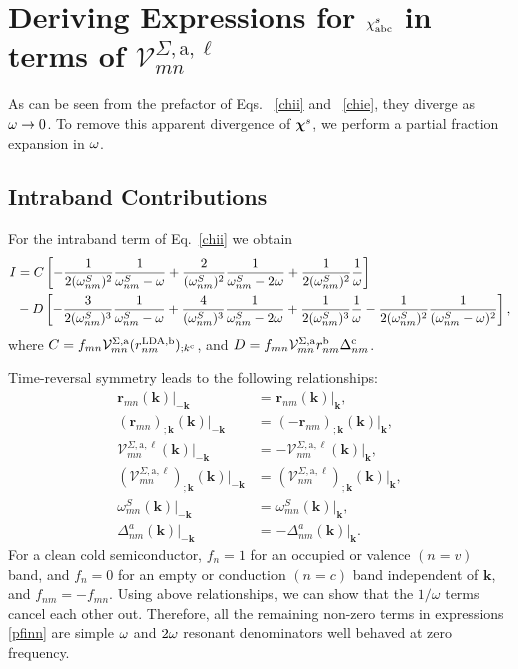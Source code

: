 \section{Deriving Expressions for \texorpdfstring{$\chi^s_{\mathrm{a}\mathrm{b}\mathrm{c}}$}{Xabc}
in terms of \texorpdfstring{$\mathcal{V}^{\Sigma,\text{a},\ell}_{mn}$}{Vmn}}
\label{appv}

As can be seen from the prefactor of Eqs. ~\eqref{chii} and
~\eqref{chie}, they 
diverge as $\omega\to 0$. To remove this apparent 
divergence of $\boldsymbol{\chi}^s$, we perform
a partial fraction  expansion in $\omega$.

\subsection{Intraband Contributions}

For the intraband term of Eq.~\eqref{chii}
we obtain
\begin{align}\label{pfinn} 
I&= 
C
\left[
-\frac{1}{2(\omega^S_{nm})^2}\frac{1}{\omega^S_{nm}-\omega}
+\frac{2}{(\omega^S_{nm})^2}\frac{1}{\omega^S_{nm}-2\omega}
+\frac{1}{2(\omega^S_{nm})^2}\frac{1}{\omega}
\right]
\nonumber\\
&-D
\left[
-\frac{3}{2(\omega^S_{nm})^3}\frac{1}{\omega^S_{nm}-\omega}
+\frac{4}{(\omega^S_{nm})^3}\frac{1}{\omega^S_{nm}-2\omega}
+\frac{1}{2(\omega^S_{nm})^3}\frac{1}{\omega}
-\frac{1}{2(\omega^S_{nm})^2}\frac{1}{(\omega^S_{nm}-\omega)^2}
\right]
,
\end{align} 
where 
$C=f_{mn}{\cal V}^{\Sigma,\mathrm{a}}_{mn}(r^{\mathrm{LDA},\mathrm{b}}_{nm})_{;k^{\mathrm{c}}}$, 
and
$D=f_{mn}{\cal V}^{\Sigma,\mathrm{a}}_{mn}r^{\mathrm{b}}_{nm}\Delta^{\mathrm{c}}_{nm}$.

Time-reversal symmetry leads to the following relationships:
\begin{align}\label{time_reversal}
    \mathbf{r}_{mn}(\mathbf{k})|_{-\mathbf{k}}
&=  \mathbf{r}_{nm}(\mathbf{k})|_{\mathbf{k}},\nonumber\\
    (\mathbf{r}_{mn})_{;\mathbf{k}}(\mathbf{k})|_{-\mathbf{k}}
&=  (-\mathbf{r}_{nm})_{;\mathbf{k}}(\mathbf{k})|_{\mathbf{k}},\nonumber\\
    \mathcal{V}^{\Sigma,\text{a},\ell}_{mn}(\mathbf{k})|_{-\mathbf{k}}
&=  -\mathbf{\mathcal{V}}_{nm}^{\Sigma,\text{a},\ell}(\mathbf{k})|_{\mathbf{k}},
    \nonumber\\
    (\mathcal{V}^{\Sigma,\text{a},\ell}_{mn})_{;\mathbf{k}}
    (\mathbf{k})|_{-\mathbf{k}}
&=  (\mathbf{\mathcal{V}}_{nm}^{\Sigma,\text{a},\ell})_{;\mathbf{k}}
    (\mathbf{k})|_{\mathbf{k}},\\
    \omega_{mn}^{S}(\mathbf{k})|_{-\mathbf{k}}
&=  \omega_{mn}^{S}(\mathbf{k})|_{\mathbf{k}},\nonumber\\
    \Delta^a_{nm}(\mathbf{k})|_{-\mathbf{k}}
&=  -\Delta^a_{nm}(\mathbf{k})|_{\mathbf{k}}.\nonumber
\end{align}
For a clean cold semiconductor, $f_{n} = 1$ for an occupied 
or valence $(n = v)$ band, and $f_{n} = 0$ for an empty 
or conduction $(n = c)$ band independent of $\mathbf{k}$, 
and $f_{nm}=-f_{mn}$.
Using above relationships, we can show that 
the $1/\omega$ terms cancel each other out. 
Therefore, all the remaining non-zero terms in expressions \eqref{pfinn}
are simple $\omega$ and $2\omega$ resonant denominators well behaved at zero
frequency. 

